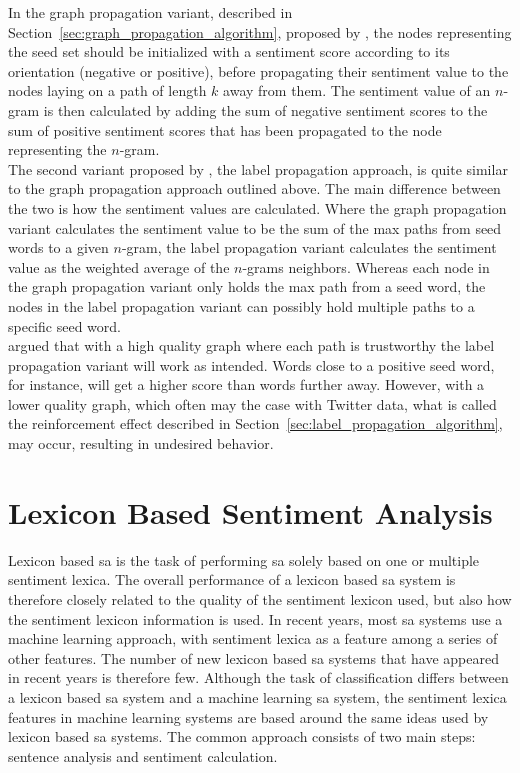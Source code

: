 In the graph propagation variant, described in Section~\ref{sec:graph_propagation_algorithm}, proposed by \cite{Velikovich2010}, the nodes representing the seed set should be initialized with a sentiment score according to its orientation (negative or positive), before propagating their sentiment value to the nodes laying on a path of length $k$ away from them. The sentiment value of an $n$-gram is then calculated by adding the sum of negative sentiment scores to the sum of positive sentiment scores that has been propagated to the node representing the $n$-gram.\\ 

The second variant proposed by \cite{Zhu02learningfrom}, the label propagation approach, is quite similar to the graph propagation approach outlined above. The main difference between the two is how the sentiment values are calculated. Where the graph propagation variant calculates the sentiment value to be the sum of the max paths from seed words to a given $n$-gram, the label propagation variant calculates the sentiment value as the weighted average of the $n$-grams neighbors. Whereas each node in the graph propagation variant only holds the max path from a seed word, the nodes in the label propagation variant can possibly hold multiple paths to a specific seed word.\\   

\citeauthor{Velikovich2010} argued that with a high quality graph where each path is trustworthy the label propagation variant will work as intended. Words close to a positive seed word, for instance, will get a higher score than words further away. However, with a lower quality graph, which often may the case with Twitter data, what is called the reinforcement effect described in Section~\ref{sec:label_propagation_algorithm}, may occur, resulting in undesired behavior.


\section{Lexicon Based Sentiment Analysis}
\label{sec:lexion_based_sentiment_analysis}
Lexicon based \ac{sa} is the task of performing \ac{sa} solely based on one or multiple sentiment lexica. The overall performance of a lexicon based \ac{sa} system is therefore closely related to the quality of the sentiment lexicon used, but also how the sentiment lexicon information is used. In recent years, most \ac{sa} systems use a machine learning approach, with sentiment lexica as a feature among a series of other features. The number of new lexicon based \ac{sa} systems that have appeared in recent years is therefore few. Although the task of classification differs between a lexicon based \ac{sa} system and a machine learning \ac{sa} system, the sentiment lexica features in machine learning systems are based around the same ideas used by lexicon based \ac{sa} systems. The common approach consists of two main steps: sentence analysis and sentiment calculation.


